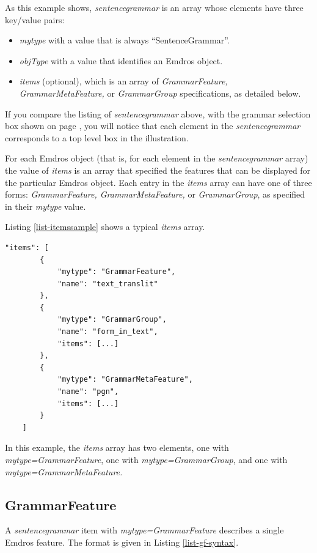 \documentclass[11pt,oneside,a4paper]{memoir}
\begin{document}
As this example shows, \emph{sentencegrammar} is an array whose elements have
three key/value pairs:

\begin{itemize}
\item \emph{mytype} with a value that is always ``SentenceGrammar''.
\item \emph{objType} with a value that identifies an Emdros object.
\item \emph{items} (optional), which is an array of \emph{GrammarFeature,
  GrammarMetaFeature,} or \emph{GrammarGroup} specifications, as detailed below.
\end{itemize}

If you compare the listing of \emph{sentencegrammar} above, with the grammar selection box shown on
page \pageref{grammarselect}, you will notice that each element in the \emph{sentencegrammar}
corresponds to a top level box in the illustration.

For each Emdros object (that is, for each element in the \emph{sentencegrammar} array) the value of
\emph{items} is an array that specified the features that can be displayed for the particular Emdros
object. Each entry in the \emph{items} array can have one of three forms: \emph{GrammarFeature,
  GrammarMetaFeature,} or \emph{GrammarGroup}, as specified in their \emph{mytype} value.

Listing \ref{list-itemssample} shows a typical \emph{items} array.

\begin{lstlisting}[caption=A sample items value,label=list-itemssample]
    "items": [
        {
            "mytype": "GrammarFeature",
            "name": "text_translit"
        },
        {
            "mytype": "GrammarGroup",
            "name": "form_in_text",
            "items": [...]
        },
        {
            "mytype": "GrammarMetaFeature",
            "name": "pgn",
            "items": [...]
        }
    ]
\end{lstlisting}

In this example, the \emph{items} array has two elements, one with \emph{mytype=GrammarFeature},
one with \emph{mytype=GrammarGroup}, and one with \emph{mytype=GrammarMetaFeature.}

\subsection{GrammarFeature}\label{sec-grammarfeature}

A \emph{sentencegrammar} item with \emph{mytype=GrammarFeature} describes a single Emdros
feature. The format is given in Listing \ref{list-gf-syntax}.
\end{document}
